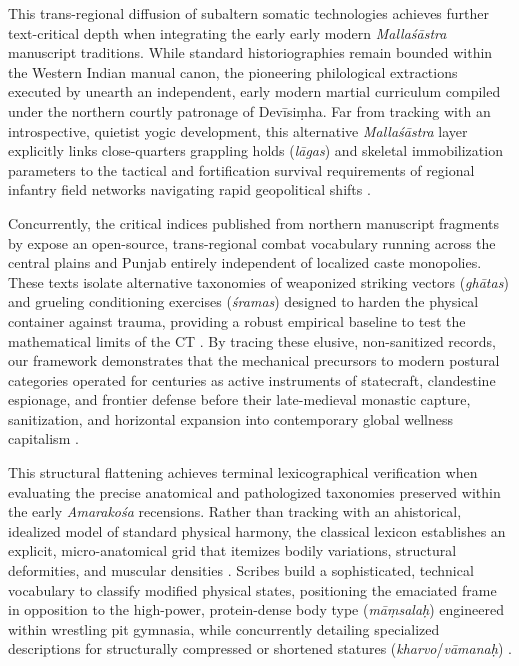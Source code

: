 \documentclass[11pt,twoside,letterpaper]{article}
\begin{document}
This trans-regional diffusion of subaltern somatic technologies achieves further text-critical depth when integrating the early early modern \textit{Mallaśāstra} manuscript traditions. While standard historiographies remain bounded within the Western Indian manual canon, the pioneering philological extractions executed by \citet{Kulkarni1959} unearth an independent, early modern martial curriculum compiled under the northern courtly patronage of Devīsiṃha. Far from tracking with an introspective, quietist yogic development, this alternative \textit{Mallaśāstra} layer explicitly links close-quarters grappling holds (\textit{lāgas}) and skeletal immobilization parameters to the tactical and fortification survival requirements of regional infantry field networks navigating rapid geopolitical shifts \citep{Kulkarni1959}. 

Concurrently, the critical indices published from northern manuscript fragments by \citet{Kulkarni1974} expose an open-source, trans-regional combat vocabulary running across the central plains and Punjab entirely independent of localized caste monopolies. These texts isolate alternative taxonomies of weaponized striking vectors (\textit{ghātas}) and grueling conditioning exercises (\textit{śramas}) designed to harden the physical container against trauma, providing a robust empirical baseline to test the mathematical limits of the CT \citep{Kulkarni1974}. By tracing these elusive, non-sanitized records, our framework demonstrates that the mechanical precursors to modern postural categories operated for centuries as active instruments of statecraft, clandestine espionage, and frontier defense before their late-medieval monastic capture, sanitization, and horizontal expansion into contemporary global wellness capitalism \citep{Kulkarni1959, Kulkarni1974, Wujastyk2025}.

This structural flattening achieves terminal lexicographical verification when evaluating the precise anatomical and pathologized taxonomies preserved within the early \textit{Amarakośa} recensions. Rather than tracking with an ahistorical, idealized model of standard physical harmony, the classical lexicon establishes an explicit, micro-anatomical grid that itemizes bodily variations, structural deformities, and muscular densities \citep{Thomas2025}. Scribes build a sophisticated, technical vocabulary to classify modified physical states, positioning the emaciated frame in opposition to the high-power, protein-dense body type (\textit{māṃsalaḥ}) engineered within wrestling pit gymnasia, while concurrently detailing specialized descriptions for structurally compressed or shortened statures (\textit{kharvo}/\textit{vāmanaḥ}) \citep{MP_7}. 
\end{document}
